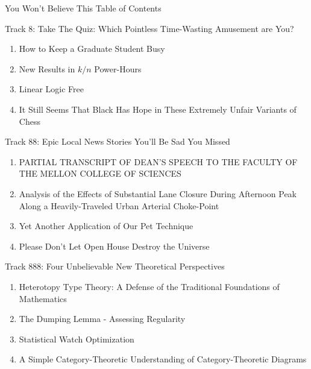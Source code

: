 \documentclass[letter]{article}
\newcommand\track[2]{{\Large Track #1: #2}}
\newcommand\paper[2]{\item \sf #1 \dotfill #2}
\newcommand\keywords[1]{}
\begin{document}
\begin{center}
{\Huge You Won't Believe This Table of Contents}
\end{center}
\thispagestyle{empty}

\vspace{6em}


\track{8}{Take The Quiz: Which Pointless Time-Wasting Amusement are You?}

\begin{enumerate}
\paper{How to Keep a Graduate Student Busy}
{3}
\keywords{all, work, and, no, play, makes, paul, a, dull, boy}
\paper{New Results in $k/n$ Power-Hours}
{5}
\keywords{generalized binge drinking, maths, finite-state automata, abstract interpretation}
\paper{Linear Logic Free}
{17}
\keywords{linear logic, free to play, app store}
\paper{It Still Seems That Black Has Hope in These Extremely Unfair Variants of Chess}
{21}
\keywords{chess, stratego, guess who, clue, candy crush saga, game-tree search, combinations}
\end{enumerate}

\vspace{4em}

\track{88}{Epic Local News Stories You'll Be Sad You Missed}

\begin{enumerate}
\paper{PARTIAL TRANSCRIPT OF DEAN'S SPEECH TO THE FACULTY OF THE MELLON COLLEGE OF SCIENCES}
{29}
\keywords{news, lane center, college of sciences}
\paper{Analysis of the Effects of Substantial Lane Closure During Afternoon Peak Along a Heavily-Traveled Urban Arterial Choke-Point}
{33}
\keywords{knowledge, pagers, RATPAG}
\paper{Yet Another Application of Our Pet Technique}
{35}
\keywords{complexity, multiple patents pending, nobel peace prize}
\paper{Please Don't Let Open House Destroy the Universe}
{41}
\keywords{open house, destruction of universe, herding cats}
\end{enumerate}

\vspace{4em}

\track{888}{Four Unbelievable New Theoretical Perspectives}

\begin{enumerate}
\paper{Heterotopy Type Theory: A Defense of the Traditional Foundations of Mathematics}
{47}
\keywords{heterotopy type theory, identity type, freedom of expression axiom}
\paper{The Dumping Lemma - Assessing Regularity}
{51}
\keywords{computational scatology, formal languages, poop jokes}
\paper{Statistical Watch Optimization}
{53}
\keywords{Watch, clock, time, probability, statistics}
\paper{A Simple Category-Theoretic Understanding of Category-Theoretic Diagrams}
{57}
\keywords{category, diagram, functor, diagram diagram}
\end{enumerate}
\end{document}
